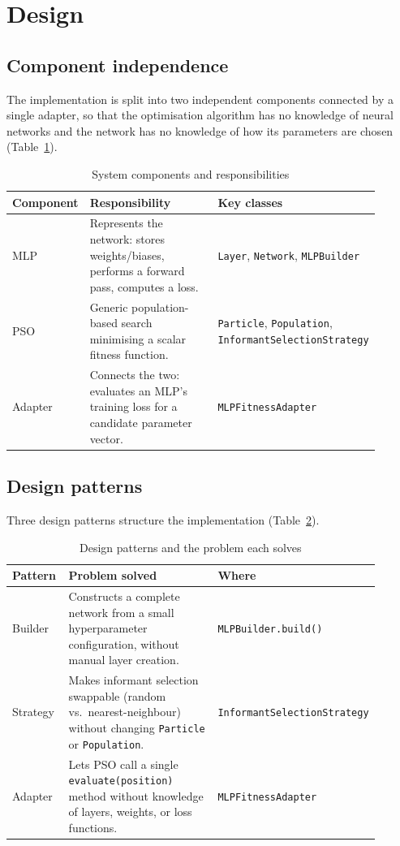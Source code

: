 \documentclass[conference]{IEEEtran}
\begin{document}
\section{Design}

\subsection{Component independence}
The implementation is split into two independent components connected by a
single adapter, so that the optimisation algorithm has no knowledge of
neural networks and the network has no knowledge of how its parameters are
chosen (Table~\ref{tab:components}).

\begin{table}[h]
\caption{System components and responsibilities}
\label{tab:components}
\centering
\begin{tabular}{p{0.18\linewidth}p{0.52\linewidth}p{0.2\linewidth}}
\toprule
\textbf{Component} & \textbf{Responsibility} & \textbf{Key classes} \\
\midrule
MLP & Represents the network: stores weights/biases, performs a forward
pass, computes a loss. & \texttt{Layer}, \texttt{Network},
\texttt{MLPBuilder} \\
PSO & Generic population-based search minimising a scalar fitness
function. & \texttt{Particle}, \texttt{Population},
\texttt{InformantSelectionStrategy} \\
Adapter & Connects the two: evaluates an MLP's training loss for a
candidate parameter vector. & \texttt{MLPFitnessAdapter} \\
\bottomrule
\end{tabular}
\end{table}

\subsection{Design patterns}
Three design patterns structure the implementation (Table~\ref{tab:patterns}).

\begin{table}[h]
\caption{Design patterns and the problem each solves}
\label{tab:patterns}
\centering
\begin{tabular}{p{0.16\linewidth}p{0.56\linewidth}p{0.18\linewidth}}
\toprule
\textbf{Pattern} & \textbf{Problem solved} & \textbf{Where} \\
\midrule
Builder & Constructs a complete network from a small hyperparameter
configuration, without manual layer creation. & \texttt{MLPBuilder.build()} \\
Strategy & Makes informant selection swappable (random vs.\
nearest-neighbour) without changing \texttt{Particle} or \texttt{Population}.
& \texttt{InformantSelectionStrategy} \\
Adapter & Lets PSO call a single \texttt{evaluate(position)} method without
knowledge of layers, weights, or loss functions. & \texttt{MLPFitnessAdapter} \\
\bottomrule
\end{tabular}
\end{table}
\end{document}
